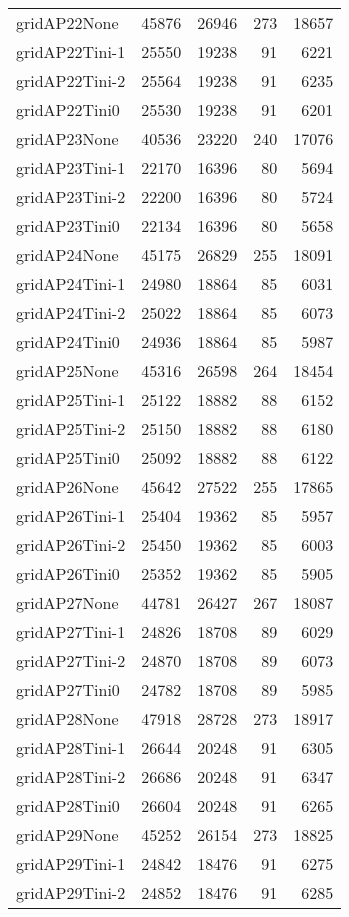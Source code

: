 \begin{longtable}{lrrrr}
gridAP22None & 45876 & 26946 & 273 & 18657 \\
gridAP22Tini-1 & 25550 & 19238 & 91 & 6221 \\
gridAP22Tini-2 & 25564 & 19238 & 91 & 6235 \\
gridAP22Tini0 & 25530 & 19238 & 91 & 6201 \\
gridAP23None & 40536 & 23220 & 240 & 17076 \\
gridAP23Tini-1 & 22170 & 16396 & 80 & 5694 \\
gridAP23Tini-2 & 22200 & 16396 & 80 & 5724 \\
gridAP23Tini0 & 22134 & 16396 & 80 & 5658 \\
gridAP24None & 45175 & 26829 & 255 & 18091 \\
gridAP24Tini-1 & 24980 & 18864 & 85 & 6031 \\
gridAP24Tini-2 & 25022 & 18864 & 85 & 6073 \\
gridAP24Tini0 & 24936 & 18864 & 85 & 5987 \\
gridAP25None & 45316 & 26598 & 264 & 18454 \\
gridAP25Tini-1 & 25122 & 18882 & 88 & 6152 \\
gridAP25Tini-2 & 25150 & 18882 & 88 & 6180 \\
gridAP25Tini0 & 25092 & 18882 & 88 & 6122 \\
gridAP26None & 45642 & 27522 & 255 & 17865 \\
gridAP26Tini-1 & 25404 & 19362 & 85 & 5957 \\
gridAP26Tini-2 & 25450 & 19362 & 85 & 6003 \\
gridAP26Tini0 & 25352 & 19362 & 85 & 5905 \\
gridAP27None & 44781 & 26427 & 267 & 18087 \\
gridAP27Tini-1 & 24826 & 18708 & 89 & 6029 \\
gridAP27Tini-2 & 24870 & 18708 & 89 & 6073 \\
gridAP27Tini0 & 24782 & 18708 & 89 & 5985 \\
gridAP28None & 47918 & 28728 & 273 & 18917 \\
gridAP28Tini-1 & 26644 & 20248 & 91 & 6305 \\
gridAP28Tini-2 & 26686 & 20248 & 91 & 6347 \\
gridAP28Tini0 & 26604 & 20248 & 91 & 6265 \\
gridAP29None & 45252 & 26154 & 273 & 18825 \\
gridAP29Tini-1 & 24842 & 18476 & 91 & 6275 \\
gridAP29Tini-2 & 24852 & 18476 & 91 & 6285 \\

\end{longtable}
